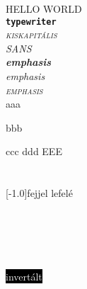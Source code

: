 \documentclass[]{article}
\begin{document}
HELLO WORLD\\
\texttt{\textbf{typewriter}}\\
\textsc{\textit{kiskapitális}}\\
\textsl{\textsf{SANS}}\\
\huge
\emph{\textbf{emphasis}}\\
\emph{\textit{emphasis}}\\
\emph{\textsc{emphasis}}\\
\normalsize
aaa \begin{Huge} bbb \end{Huge} ccc ddd \MakeUppercase{eee}\\
\\
\\
\scalebox{2.0}[-1.0]{fejjel lefelé}\\
\\
\\
\\
\\
\\
\colorbox{black}{\textcolor{white}{invertált}}\\
\textcolor{red}{}
\end{document}

